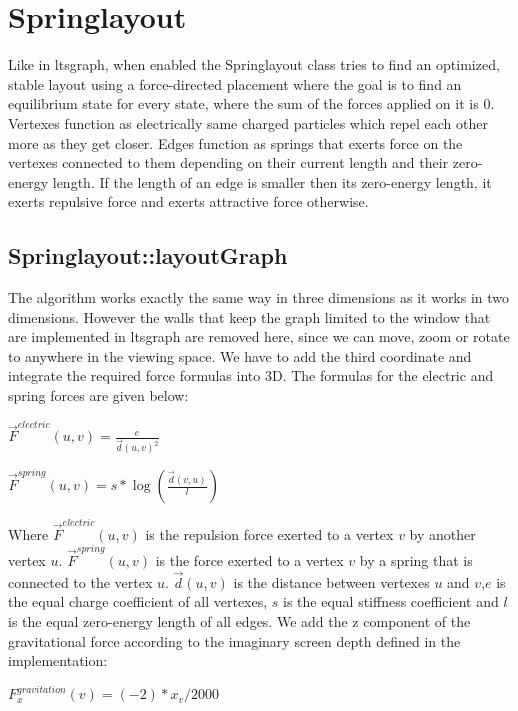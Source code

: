 \documentclass[a4paper]{article}
\begin{document}
\section{Springlayout}
Like in ltsgraph, when enabled the Springlayout class tries to find an optimized, stable layout using a force-directed placement where the goal is to find an equilibrium state for every state, where the sum of the forces applied on it is 0. Vertexes function as electrically same charged particles which repel each other more as they get closer. Edges function as springs that exerts force on the vertexes connected to them depending on their current length and their zero-energy length. If the length of an edge is smaller then its zero-energy length, it exerts repulsive force and exerts attractive force otherwise.
\subsection{Springlayout::layoutGraph}
The algorithm works exactly the same way in three dimensions as it works in two dimensions. However the walls that keep the graph limited to the window that are implemented in ltsgraph are removed here, since we can move, zoom or rotate to anywhere in the viewing space. We have to add the third coordinate and integrate the required force formulas into 3D. The formulas for the electric and spring forces are given below: 
\begin{center}
\begin{math}
\vec{F}^{electric}(u,v)=\displaystyle\frac{e}{\vec{d}(u,v)^2}
\end{math}
\end{center}
\begin{center}
\begin{math}
\vec{F}^{spring}(u,v)=s*\displaystyle\log{\left(\frac{\vec{d}(v,u)}{l}\right)}
\end{math}
\end{center}
Where $\vec{F}^{electric}(u,v)$ is the repulsion force exerted to a vertex $v$ by another vertex $u$. $\vec{F}^{spring}(u,v)$ is the force exerted to a vertex $v$ by a spring that is connected to the vertex $u$. $\vec{d}(u,v)$ is the distance between vertexes $u$ and $v$,$e$ is the equal charge coefficient of all vertexes, $s$ is the equal stiffness coefficient and $l$ is the equal zero-energy length of all edges.
We add the z component of the gravitational force according to the imaginary screen depth defined in the implementation:
\begin{center}
\begin{math}
F_x^{gravitation}(v)=(-2)*x_v/2000
\end{math}
\end{center}
\end{document}
